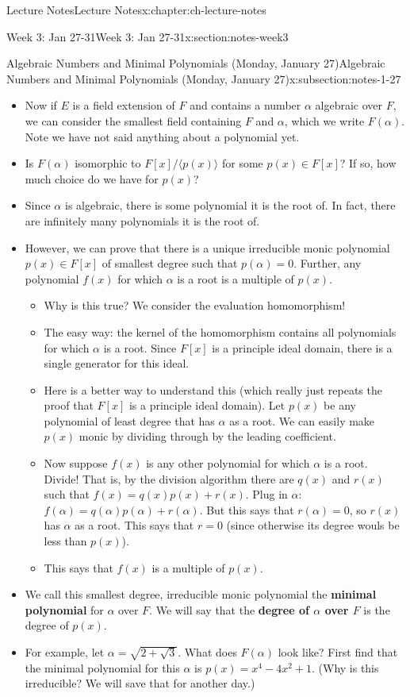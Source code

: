 \documentclass[oneside,11pt,]{book}
\newcommand{\terminology}[1]{\textbf{#1}}
\begin{document}
\begin{chapterptx}{Lecture Notes}{}{Lecture Notes}{}{}{x:chapter:ch-lecture-notes}
\begin{sectionptx}{Week 3: Jan 27-31}{}{Week 3: Jan 27-31}{}{}{x:section:notes-week3}
\begin{subsectionptx}{Algebraic Numbers and Minimal Polynomials (Monday, January 27)}{}{Algebraic Numbers and Minimal Polynomials (Monday, January 27)}{}{}{x:subsection:notes-1-27}
\begin{itemize}[label=\textbullet]
\item{}Now if \(E\) is a field extension of \(F\) and contains a number \(\alpha\) algebraic over \(F\), we can consider the smallest field containing \(F\) and \(\alpha\), which we write \(F(\alpha)\).  Note we have not said anything about a polynomial yet.%
\item{}Is \(F(\alpha)\) isomorphic to \(F[x]/\langle p(x) \rangle\) for some \(p(x) \in F[x]\)?  If so, how much choice do we have for \(p(x)\)?%
\item{}Since \(\alpha\) is algebraic, there is some polynomial it is the root of.  In fact, there are infinitely many polynomials it is the root of.%
\item{}However, we can prove that there is a unique irreducible monic polynomial \(p(x) \in F[x]\) of smallest degree such that \(p(\alpha) = 0\).  Further, any polynomial \(f(x)\) for which \(\alpha\) is a root is a multiple of \(p(x)\).%
\begin{itemize}[label=$\circ$]
\item{}Why is this true?  We consider the evaluation homomorphism!%
\item{}The easy way: the kernel of the homomorphism contains all polynomials for which \(\alpha\) is a root.  Since \(F[x]\) is a principle ideal domain, there is a single generator for this ideal.%
\item{}Here is a better way to understand this (which really just repeats the proof that \(F[x]\) is a principle ideal domain).  Let \(p(x)\) be any polynomial of least degree that has \(\alpha\) as a root.  We can easily make \(p(x)\) monic by dividing through by the leading coefficient.%
\item{}Now suppose \(f(x)\) is any other polynomial for which \(\alpha\) is a root.  Divide!  That is, by the division algorithm there are \(q(x)\) and \(r(x)\) such that \(f(x) =q(x)p(x) + r(x)\).  Plug in \(\alpha\): \(f(\alpha) = q(\alpha)p(\alpha) + r(\alpha)\).  But this says that \(r(\alpha) = 0\), so \(r(x)\) has \(\alpha\) as a root.  This says that \(r = 0\) (since otherwise its degree wouls be less than \(p(x)\)).%
\item{}This says that \(f(x)\) is a multiple of \(p(x)\).%
\end{itemize}
%
\item{}We call this smallest degree, irreducible monic polynomial the \terminology{minimal polynomial} for \(\alpha\) over \(F\).  We will say that the \terminology{degree of \(\alpha\) over \(F\)} is the degree of \(p(x)\).%
\item{}For example, let \(\alpha = \sqrt{2 + \sqrt{3}}\). What does \(F(\alpha)\) look like?  First find that the minimal polynomial for this \(\alpha\) is \(p(x) = x^4 - 4x^2 + 1\).  (Why is this irreducible?  We will save that for another day.)%

\end{itemize}
\end{subsectionptx}
\end{sectionptx}
\end{chapterptx}
\end{document}
